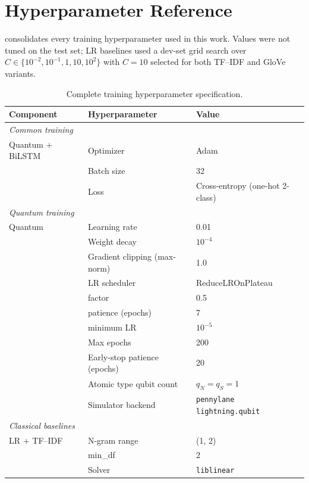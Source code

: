 \documentclass[runningheads]{llncs}
\begin{document}
\section{Hyperparameter Reference}\label{app:hparams}

 consolidates every training hyperparameter used in
this work. Values were not tuned on the test set; LR baselines used a
dev-set grid search over \(C \in \{10^{-2}, 10^{-1}, 1, 10, 10^{2}\}\)
with \(C=10\) selected for both TF--IDF and GloVe variants.

\begin{table}[h!]
\centering
\caption{Complete training hyperparameter specification.}
\label{tab:hparams}
\begin{tabular}{lll}
\toprule
Component & Hyperparameter & Value \\
\midrule
\multicolumn{3}{l}{\emph{Common training}} \\
\midrule
Quantum + BiLSTM & Optimizer & Adam \\
                 & Batch size & 32 \\
                 & Loss & Cross-entropy (one-hot 2-class) \\
\midrule
\multicolumn{3}{l}{\emph{Quantum training}} \\
\midrule
Quantum & Learning rate & 0.01 \\
        & Weight decay  & \(10^{-4}\) \\
        & Gradient clipping (max-norm) & 1.0 \\
        & LR scheduler & ReduceLROnPlateau \\
        & \quad factor & 0.5 \\
        & \quad patience (epochs) & 7 \\
        & \quad minimum LR & \(10^{-5}\) \\
        & Max epochs & 200 \\
        & Early-stop patience (epochs) & 20 \\
        & Atomic type qubit count & \(q_N = q_S = 1\) \\
        & Simulator backend & \texttt{pennylane lightning.qubit} \\
\midrule
\multicolumn{3}{l}{\emph{Classical baselines}} \\
\midrule
LR + TF--IDF  & N-gram range & (1, 2) \\
              & min\_df & 2 \\
              & Solver & \texttt{liblinear} \\

\end{tabular}
\end{table}
\end{document}

